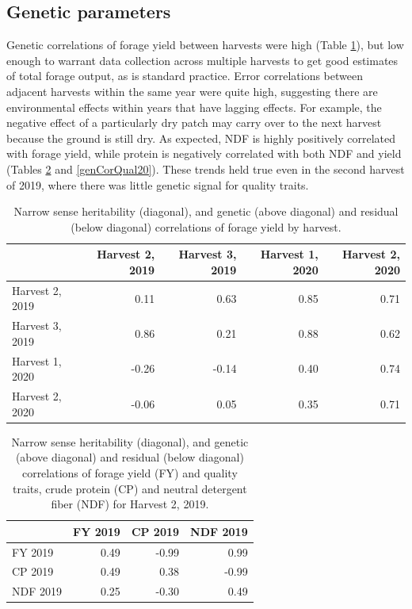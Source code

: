 \documentclass[12pt, letterpaper]{article}
\begin{document}
\subsection{Genetic parameters}

Genetic correlations of forage yield between harvests were high (Table \ref{genCorYld}), but low enough to warrant data collection across multiple harvests to get good estimates of total forage output, as is standard practice. Error correlations between adjacent harvests within the same year were quite high, suggesting there are environmental effects within years that have lagging effects. For example, the negative effect of a particularly dry patch may carry over to the next harvest because the ground is still dry. As expected, NDF is highly positively correlated with forage yield, while protein is negatively correlated with both NDF and yield (Tables \ref{genCorQual19} and \ref{genCorQual20}). These trends held true even in the second harvest of 2019, where there was little genetic signal for quality traits. 



\begin{table}[ht]
\caption{Narrow sense heritability (diagonal), and genetic (above diagonal) and residual (below diagonal) correlations of forage yield by harvest.}
\centering
\begin{tabular*}{\hsize}{@{\extracolsep{\fill}}lrrrr}
 & Harvest 2, 2019 & Harvest 3, 2019 & Harvest 1, 2020 & Harvest 2, 2020 \\ 
  \hline
Harvest 2, 2019 & 0.11 & 0.63 & 0.85 & 0.71 \\ 
  Harvest 3, 2019 & 0.86 & 0.21 & 0.88 & 0.62 \\ 
  Harvest 1, 2020 & -0.26 & -0.14 & 0.40 & 0.74 \\ 
  Harvest 2, 2020 & -0.06 & 0.05 & 0.35 & 0.71 \\ 
   \hline
\end{tabular*}
\label{genCorYld}
\end{table}


\begin{table}[ht]
\caption{Narrow sense heritability (diagonal), and genetic (above diagonal) and residual (below diagonal) correlations of forage yield (FY) and quality traits, crude protein (CP) and neutral detergent fiber (NDF) for Harvest 2, 2019.}
\centering
\begin{tabular*}{\hsize}{@{\extracolsep{\fill}}lrrr}
 & FY 2019 & CP 2019 & NDF 2019 \\ 
  \hline
FY 2019 & 0.49 & -0.99 & 0.99 \\ 
  CP 2019 & 0.49 & 0.38 & -0.99 \\ 
  NDF 2019 & 0.25 & -0.30 & 0.49 \\ 
   \hline
\end{tabular*}
\label{genCorQual19}
\end{table}
\end{document}
